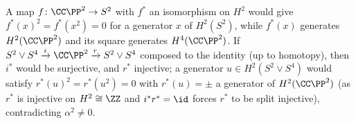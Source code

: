 \begin{solution}
A map $f \colon \CC\PP^2 \to S^2$ with $f^*$ an isomorphism on $H^2$ would give $f^*(x)^2 = f^*(x^2) = 0$ for a generator $x$ of $H^2(S^2)$, while $f^*(x)$ generates $H^2(\CC\PP^2)$
and its square generates $H^4(\CC\PP^2)$. If $S^2 \vee S^4 \xrightarrow{i} \CC\PP^2 \xrightarrow{r} S^2 \vee S^4$ composed to the identity (up to homotopy), then $i^*$ would be
surjective, and $r^*$ injective; a generator $u \in H^2(S^2 \vee S^4)$ would satisfy $r^*(u)^2 = r^*(u^2) = 0$ with $r^*(u) = \pm$ a generator of $H^2(\CC\PP^2)$ (as $r^*$ is
injective on $H^2 \cong \ZZ$ and $i^*r^* = \id$ forces $r^*$ to be split injective), contradicting $\alpha^2 \neq 0$.
\end{solution}
